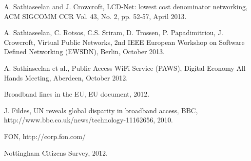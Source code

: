 \documentclass[conference]{IEEEtran}
\begin{document}
%
%
\begin{thebibliography}{15}








A. Sathiaseelan and J. Crowcroft, LCD-Net: lowest cost denominator networking, ACM SIGCOMM CCR Vol. 43, No. 2,  pp. 52-57, April 2013.

A. Sathiaseelan, C. Rotsos, C.S. Sriram, D. Trossen, P. Papadimitriou, J. Crowcroft, Virtual Public Networks, 2nd IEEE European Workshop on Software Defined Networking (EWSDN), Berlin, October 2013.

A. Sathiaseelan et al., Public Access WiFi Service (PAWS), Digital Economy All Hands Meeting, Aberdeen, October 2012.

Broadband lines in the EU, EU document, 2012.

J. Fildes, UN reveals global disparity in broadband access, BBC, http://www.bbc.co.uk/news/technology-11162656, 2010.

FON, http://corp.fon.com/

Nottingham Citizens Survey, 2012.








\end{thebibliography}
\end{document}

